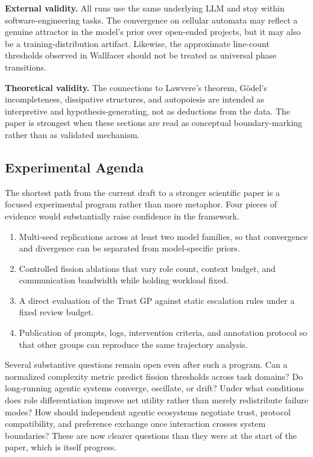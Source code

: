 \textbf{External validity.} All runs use the same underlying LLM and stay within software-engineering tasks. The convergence on cellular automata may reflect a genuine attractor in the model's prior over open-ended projects, but it may also be a training-distribution artifact. Likewise, the approximate line-count thresholds observed in Wallfacer should not be treated as universal phase transitions.

\textbf{Theoretical validity.} The connections to Lawvere's theorem, G\"odel's incompleteness, dissipative structures, and autopoiesis are intended as interpretive and hypothesis-generating, not as deductions from the data. The paper is strongest when these sections are read as conceptual boundary-marking rather than as validated mechanism.

\subsection{Experimental Agenda}

The shortest path from the current draft to a stronger scientific paper is a focused experimental program rather than more metaphor. Four pieces of evidence would substantially raise confidence in the framework.

\begin{enumerate}[leftmargin=*]
\item Multi-seed replications across at least two model families, so that convergence and divergence can be separated from model-specific priors.
\item Controlled fission ablations that vary role count, context budget, and communication bandwidth while holding workload fixed.
\item A direct evaluation of the Trust GP against static escalation rules under a fixed review budget.
\item Publication of prompts, logs, intervention criteria, and annotation protocol so that other groups can reproduce the same trajectory analysis.
\end{enumerate}


Several substantive questions remain open even after such a program. Can a normalized complexity metric predict fission thresholds across task domains? Do long-running agentic systems converge, oscillate, or drift? Under what conditions does role differentiation improve net utility rather than merely redistribute failure modes? How should independent agentic ecosystems negotiate trust, protocol compatibility, and preference exchange once interaction crosses system boundaries? These are now clearer questions than they were at the start of the paper, which is itself progress.
